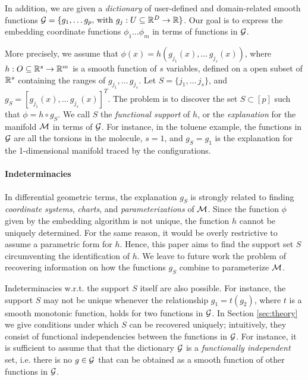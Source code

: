 In addition, we are given a {\em dictionary} of user-defined and domain-related smooth functions ${\cal G}=\{g_1,\ldots g_p,\,\text{with }g_j: U \subseteq {\mathbb R}^D \rightarrow {\mathbb R}\}$. Our goal is to express the embedding coordinate functions 
$\phi_1 \dotsc \phi_m$ in terms of functions in ${\cal G}$.

More precisely, we assume that
$\phi(x)=h(g_{j_1}(x),\ldots\,g_{j_s}(x))$, where $h:O\subseteq
{\mathbb R}^s\rightarrow {\mathbb R}^m$ is a smooth function of $s$ variables, defined
on a open subset of ${\mathbb R}^s$ containing the ranges of
$g_{j_1},\ldots\,g_{j_s}$. Let $S=\{{j_1},\ldots\,{j_s}\}$, and
$g_S=[g_{j_1}(x),\ldots\,g_{j_s}(x)]^T$. The problem is to discover the
set $S\subset [p]$ such that $\phi=h\circ g_S$. We call $S$ the {\em
  functional support} of $h$, or the {\em explanation} for the
manifold ${\cal M}$ in terms of ${\cal G}$. For instance, in the toluene
example, the functions in ${\cal G}$ are all the torsions in the
molecule, $s=1$, and $g_S=g_1$ is the explanation for the
1-dimensional manifold traced by the configurations.

\paragraph{Indeterminacies}
In differential geometric terms, the explanation $g_S$ is strongly related to finding {\em coordinate systems}, {\em charts}, and {\em parameterizations} of ${\cal M}$.
Since the function $\phi$ given by the embedding algorithm is not unique, the function $h$ cannot be uniquely determined. For the same reason, it would be overly restrictive to assume a parametric form for $h$. Hence, this paper aims to find the support set $S$ circumventing the identification of $h$. We leave to future work the problem of recovering information on how the functions $g_S$ combine to parameterize ${\cal M}$.

Indeterminacies w.r.t. the support $S$ itself are also possible. For instance, the support $S$ may not be unique whenever the relationship  $g_1=t(g_2)$, where $t$ is a smooth monotonic function, holds for two functions in ${\cal G}$.
 In Section \ref{sec:theory}
we give conditions under which $S$ can be
recovered uniquely; intuitively, they consist of functional
independencies between the functions in ${\cal G}$. For instance, it is
sufficient to assume that that the dictionary ${\cal G}$ is a {\em
  functionally independent} set, i.e. there is no $g\in {\cal G}$ that can be
obtained as a smooth function of other functions in ${\cal G}$. 

